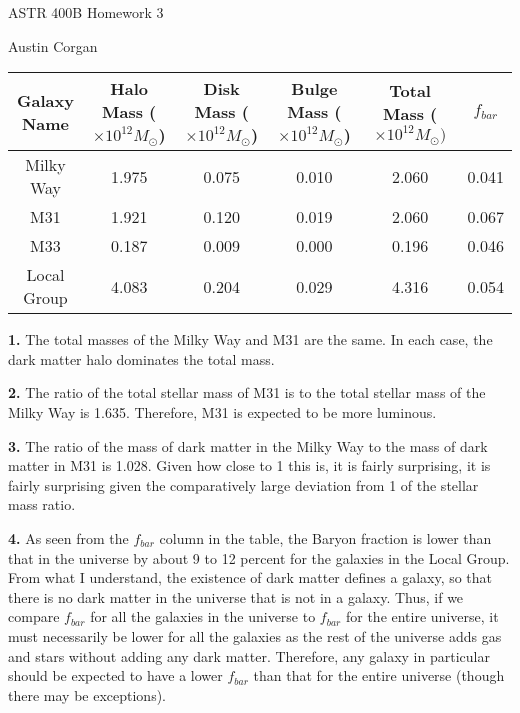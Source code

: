 \documentclass{article}
\begin{document}
\begin{center}
    \begin{Large}
    ASTR 400B Homework 3 \\
    \end{Large}
    Austin Corgan
\end{center}

\begin{center}
    \begin{tabular}{||c|c|c|c|c|c||}
        \hline\hline 
        Galaxy Name & Halo Mass ($\times 10^{12} M_{\odot}$) & Disk Mass ($\times 10^{12} M_{\odot}$) & Bulge Mass ($\times 10^{12} M_{\odot}$) & Total Mass ($\times 10^{12} M_{\odot})$ & $f_{bar}$\\
        \hline\hline 
         Milky Way & 1.975 & 0.075 & 0.010 & 2.060 & 0.041\\
         \hline 
         M31 & 1.921 & 0.120 & 0.019 & 2.060 & 0.067\\
         \hline
         M33 & 0.187 & 0.009 & 0.000 & 0.196 & 0.046\\
         \hline Local Group & 4.083 & 0.204 & 0.029 & 4.316 & 0.054\\
         \hline\hline 
    \end{tabular}
\end{center}


\noindent\textbf{1.} The total masses of the Milky Way and M31 are the same. In each case, the dark matter halo dominates the total mass. 

\medskip

\noindent\textbf{2.} The ratio of the total stellar mass of M31 is to the total stellar mass of the Milky Way is 1.635. Therefore, M31 is expected to be more luminous. 

\medskip  

\noindent\textbf{3.} The ratio of the mass of dark matter in the Milky Way to the mass of dark matter in M31 is 1.028. Given how close to 1 this is, it is fairly surprising, it is fairly surprising given the comparatively large deviation from 1 of the stellar mass ratio. 

\medskip

\noindent\textbf{4.} As seen from the $f_{bar}$ column in the table, the Baryon fraction is lower than that in the universe by about 9 to 12 percent for the galaxies in the Local Group. From what I understand, the existence of dark matter defines a galaxy, so that there is no dark matter in the universe that is not in a galaxy. Thus, if we compare $f_{bar}$ for all the galaxies in the universe to $f_{bar}$ for the entire universe, it must necessarily be lower for all the galaxies as the rest of the universe adds gas and stars without adding any dark matter. Therefore, any galaxy in particular should be expected to have a lower $f_{bar}$ than that for the entire universe (though there may be exceptions).  
\end{document}
